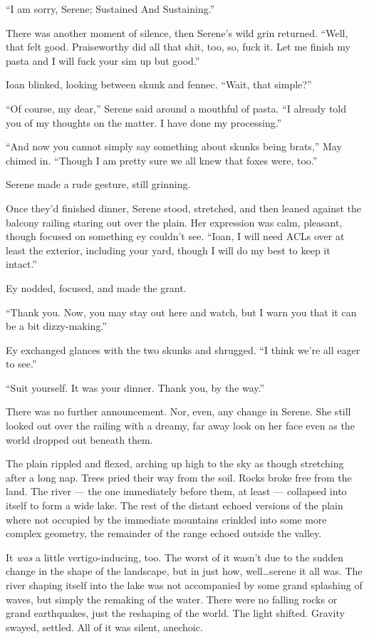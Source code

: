 ``I am sorry, Serene; Sustained And Sustaining.''

There was another moment of silence, then Serene's wild grin returned. ``Well, that felt good. Praiseworthy did all that shit, too, so, fuck it. Let me finish my pasta and I will fuck your sim up but good.''

Ioan blinked, looking between skunk and fennec. ``Wait, that simple?''

``Of course, my dear,'' Serene said around a mouthful of pasta. ``I already told you of my thoughts on the matter. I have done my processing.''

``And now you cannot simply say something about skunks being brats,'' May chimed in. ``Though I am pretty sure we all knew that foxes were, too.''

Serene made a rude gesture, still grinning.

Once they'd finished dinner, Serene stood, stretched, and then leaned against the balcony railing staring out over the plain. Her expression was calm, pleasant, though focused on something ey couldn't see. ``Ioan, I will need ACLs over at least the exterior, including your yard, though I will do my best to keep it intact.''

Ey nodded, focused, and made the grant.

``Thank you. Now, you may stay out here and watch, but I warn you that it can be a bit dizzy-making.''

Ey exchanged glances with the two skunks and shrugged. ``I think we're all eager to see.''

``Suit yourself. It was your dinner. Thank you, by the way.''

There was no further announcement. Nor, even, any change in Serene. She still looked out over the railing with a dreamy, far away look on her face even as the world dropped out beneath them.

The plain rippled and flexed, arching up high to the sky as though stretching after a long nap. Trees pried their way from the soil. Rocks broke free from the land. The river — the one immediately before them, at least — collapsed into itself to form a wide lake. The rest of the distant echoed versions of the plain where not occupied by the immediate mountains crinkled into some more complex geometry, the remainder of the range echoed outside the valley.

It \emph{was} a little vertigo-inducing, too. The worst of it wasn't due to the sudden change in the shape of the landscape, but in just how, well\ldots serene it all was. The river shaping itself into the lake was not accompanied by some grand splashing of waves, but simply the remaking of the water. There were no falling rocks or grand earthquakes, just the reshaping of the world. The light shifted. Gravity swayed, settled. All of it was silent, anechoic.

